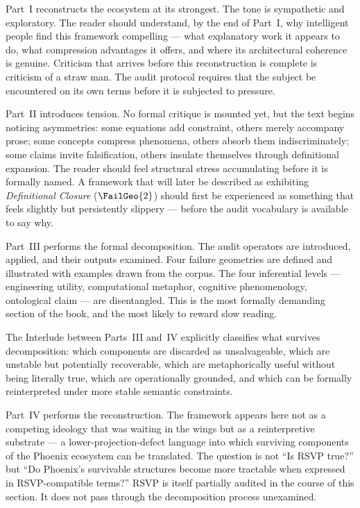 Part~I reconstructs the \Phoenix{} ecosystem at its strongest. The
tone is sympathetic and exploratory. The reader should understand,
by the end of Part~I, why intelligent people find this framework
compelling --- what explanatory work it appears to do, what
compression advantages it offers, and where its architectural
coherence is genuine. Criticism that arrives before this reconstruction
is complete is criticism of a straw man. The audit protocol requires
that the subject be encountered on its own terms before it is
subjected to pressure.

Part~II introduces tension. No formal critique is mounted yet, but
the text begins noticing asymmetries: some equations add constraint,
others merely accompany prose; some concepts compress phenomena,
others absorb them indiscriminately; some claims invite falsification,
others insulate themselves through definitional expansion. The reader
should feel structural stress accumulating before it is formally named.
A framework that will later be described as exhibiting
\emph{Definitional Closure} ($\FailGeo{2}$) should first be
experienced as something that feels slightly but persistently
slippery --- before the audit vocabulary is available to say why.

Part~III performs the formal decomposition. The audit operators are
introduced, applied, and their outputs examined. Four failure
geometries are defined and illustrated with examples drawn from the
corpus. The four inferential levels --- engineering utility,
computational metaphor, cognitive phenomenology, ontological claim ---
are disentangled. This is the most formally demanding section of the
book, and the most likely to reward slow reading.

The Interlude between Parts~III and~IV explicitly classifies what
survives decomposition: which components are discarded as
unsalvageable, which are unstable but potentially recoverable, which
are metaphorically useful without being literally true, which are
operationally grounded, and which can be formally reinterpreted under
more stable semantic constraints.

Part~IV performs the reconstruction. The \RSVPfull{} framework
appears here not as a competing ideology that was waiting in the wings
but as a reinterpretive substrate --- a lower-projection-defect
language into which surviving components of the Phoenix ecosystem can
be translated. The question is not \enquote{Is RSVP true?} but
\enquote{Do Phoenix's survivable structures become more tractable when
expressed in RSVP-compatible terms?} RSVP is itself partially audited
in the course of this section. It does not pass through the
decomposition process unexamined.

